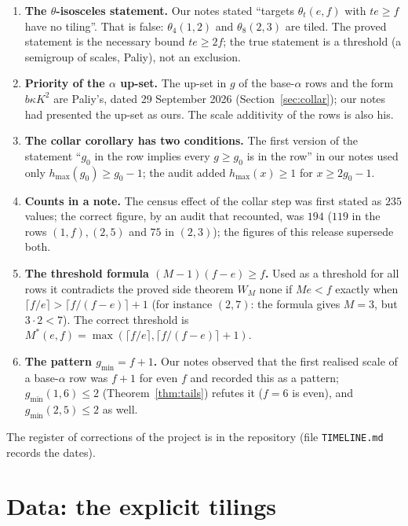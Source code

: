 \documentclass[11pt,reqno]{amsart}
\theoremstyle{plain}
\theoremstyle{definition}
\begin{document}
\begin{enumerate}
\item \textbf{The $\theta$-isosceles statement.} Our notes stated ``targets $\theta_t(e,f)$ with $te\ge f$ have no tiling''. That is false: $\theta_4(1,2)$ and $\theta_8(2,3)$ are tiled. The proved statement is the necessary bound $te\ge2f$; the true statement is a threshold (a semigroup of scales, Paliy), not an exclusion.
\item \textbf{Priority of the $\alpha$ up-set.} The up-set in $g$ of the base-$\alpha$ rows and the form $b\kappa K^2$ are Paliy's, dated 29 September 2026 (Section~\ref{sec:collar}); our notes had presented the up-set as ours. The scale additivity of the rows is also his.
\item \textbf{The collar corollary has two conditions.} The first version of the statement ``$g_0$ in the row implies every $g\ge g_0$ is in the row'' in our notes used only $h_{\max}(g_0)\ge g_0-1$; the audit added $h_{\max}(x)\ge1$ for $x\ge2g_0-1$.
\item \textbf{Counts in a note.} The census effect of the collar step was first stated as $235$ values; the correct figure, by an audit that recounted, was $194$ ($119$ in the rows $(1,f),(2,5)$ and $75$ in $(2,3)$); the figures of this release supersede both.
\item \textbf{The threshold formula $(M-1)(f-e)\ge f$.} Used as a threshold for all rows it contradicts the proved side theorem $W_M$ none if $Me<f$ exactly when $\lceil f/e\rceil>\lceil f/(f-e)\rceil+1$ (for instance $(2,7)$: the formula gives $M=3$, but $3\cdot2<7$). The correct threshold is $M^*(e,f)=\max(\lceil f/e\rceil,\lceil f/(f-e)\rceil+1)$.
\item \textbf{The pattern $g_{\min}=f+1$.} Our notes observed that the first realised scale of a base-$\alpha$ row was $f+1$ for even $f$ and recorded this as a pattern; $g_{\min}(1,6)\le2$ (Theorem~\ref{thm:tails}) refutes it ($f=6$ is even), and $g_{\min}(2,5)\le2$ as well.
\end{enumerate}
The register of corrections of the project is in the repository (file \texttt{TIMELINE.md} records the dates).

\section{Data: the explicit tilings}\label{app:data}
\end{document}
